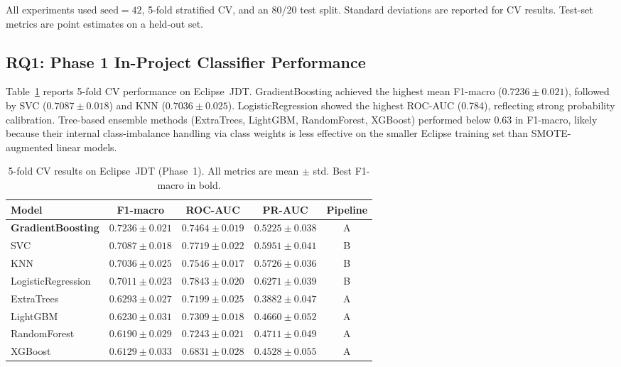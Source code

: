 \documentclass[12pt, a4paper]{article}
\newcommand{\model}[1]{\textsf{#1}}
\begin{document}
All experiments used $\text{seed}=42$, 5-fold stratified CV, and an 80/20
test split. Standard deviations are reported for CV results.
Test-set metrics are point estimates on a held-out set.

\subsection{RQ1: Phase 1 In-Project Classifier Performance}

Table~\ref{tab:p1_eclipse} reports 5-fold CV performance on Eclipse~JDT.
\model{GradientBoosting} achieved the highest mean F1-macro
($0.7236 \pm 0.021$), followed by \model{SVC} ($0.7087 \pm 0.018$) and
\model{KNN} ($0.7036 \pm 0.025$). \model{LogisticRegression} showed the
highest ROC-AUC (0.784), reflecting strong probability calibration.
Tree-based ensemble methods (\model{ExtraTrees}, \model{LightGBM},
\model{RandomForest}, \model{XGBoost}) performed below 0.63 in F1-macro,
likely because their internal class-imbalance handling via class weights is
less effective on the smaller Eclipse training set than SMOTE-augmented
linear models.

\begin{table}[H]
\caption{5-fold CV results on Eclipse~JDT (Phase~1). All metrics are
mean $\pm$ std. Best F1-macro in bold.}
\label{tab:p1_eclipse}
\centering
\small
\renewcommand{\arraystretch}{1.2}
\begin{tabular}{@{}lcccc@{}}
\toprule
\textbf{Model} & \textbf{F1-macro} & \textbf{ROC-AUC}
  & \textbf{PR-AUC} & \textbf{Pipeline} \\
\midrule
\textbf{GradientBoosting} & $\mathbf{0.7236 \pm 0.021}$ & $0.7464 \pm 0.019$
  & $0.5225 \pm 0.038$ & A \\
SVC                  & $0.7087 \pm 0.018$ & $0.7719 \pm 0.022$
  & $0.5951 \pm 0.041$ & B \\
KNN                  & $0.7036 \pm 0.025$ & $0.7546 \pm 0.017$
  & $0.5726 \pm 0.036$ & B \\
LogisticRegression   & $0.7011 \pm 0.023$ & $0.7843 \pm 0.020$
  & $0.6271 \pm 0.039$ & B \\
ExtraTrees           & $0.6293 \pm 0.027$ & $0.7199 \pm 0.025$
  & $0.3882 \pm 0.047$ & A \\
LightGBM             & $0.6230 \pm 0.031$ & $0.7309 \pm 0.018$
  & $0.4660 \pm 0.052$ & A \\
RandomForest         & $0.6190 \pm 0.029$ & $0.7243 \pm 0.021$
  & $0.4711 \pm 0.049$ & A \\
XGBoost              & $0.6129 \pm 0.033$ & $0.6831 \pm 0.028$
  & $0.4528 \pm 0.055$ & A \\
\bottomrule
\end{tabular}
\end{table}
\end{document}
